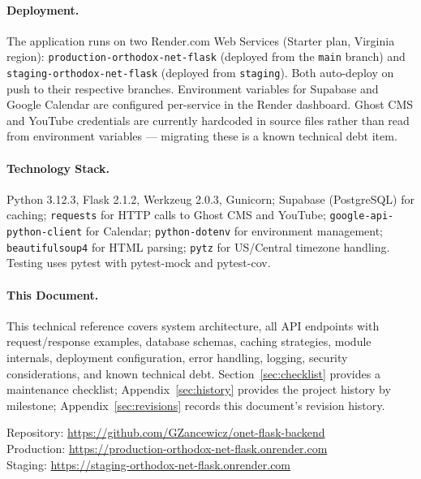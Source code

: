 \documentclass[12pt]{article}
\begin{document}
{\paragraph{Deployment.} The application runs on two Render.com Web Services (Starter plan, Virginia region): \texttt{production-orthodox-net-flask} (deployed from the \texttt{main} branch) and \texttt{staging-orthodox-net-flask} (deployed from \texttt{staging}). Both auto-deploy on push to their respective branches. Environment variables for Supabase and Google Calendar are configured per-service in the Render dashboard. Ghost CMS and YouTube credentials are currently hardcoded in source files rather than read from environment variables --- migrating these is a known technical debt item.

\paragraph{Technology Stack.} Python 3.12.3, Flask 2.1.2, Werkzeug 2.0.3, Gunicorn; Supabase (PostgreSQL) for caching; \texttt{requests} for HTTP calls to Ghost CMS and YouTube; \texttt{google-api-python-client} for Calendar; \texttt{python-dotenv} for environment management; \texttt{beautifulsoup4} for HTML parsing; \texttt{pytz} for US/Central timezone handling. Testing uses pytest with pytest-mock and pytest-cov.

\paragraph{This Document.} This technical reference covers system architecture, all API endpoints with request/response examples, database schemas, caching strategies, module internals, deployment configuration, error handling, logging, security considerations, and known technical debt. Section~\ref{sec:checklist} provides a maintenance checklist; Appendix~\ref{sec:history} provides the project history by milestone; Appendix~\ref{sec:revisions} records this document's revision history.

\vspace{1em}
\begin{center}
\footnotesize
Repository: \url{https://github.com/GZancewicz/onet-flask-backend}\\
Production: \url{https://production-orthodox-net-flask.onrender.com}\\
Staging: \url{https://staging-orthodox-net-flask.onrender.com}
\end{center}
}%
\end{document}
